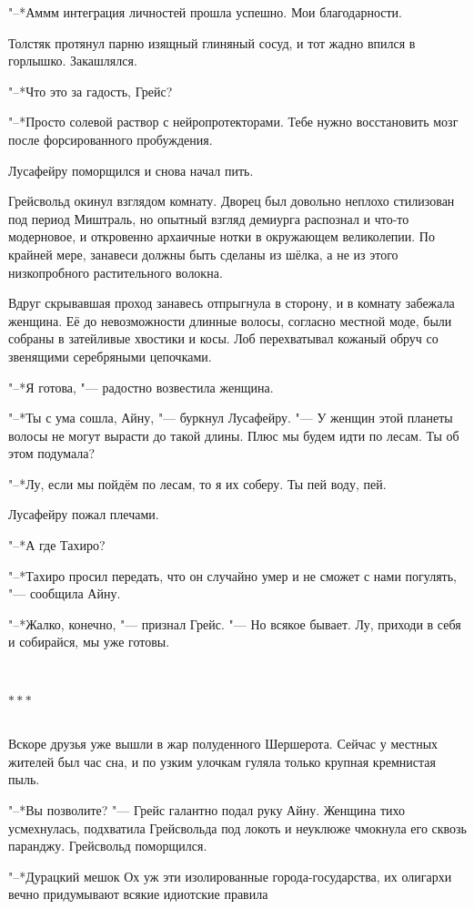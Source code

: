 \documentclass[a4paper,10pt]{book}
\newcommand{\ldotst}{\so{...}\xspace}
\newcommand{\razd}{~\\{\centering\Large\bfseries$\ast \ast \ast$\par}~\\}
\begin{document}
"--*Аммм\ldotst интеграция личностей прошла успешно. Мои благодарности.

Толстяк протянул парню изящный глиняный сосуд, и тот жадно впился в горлышко. 
Закашлялся.

"--*Что это за гадость, Грейс?

"--*Просто солевой раствор с нейропротекторами. Тебе нужно восстановить мозг 
после форсированного пробуждения.

Лусафейру поморщился и снова начал пить.

Грейсвольд окинул взглядом комнату. Дворец был довольно неплохо стилизован под 
период Миштраль, но опытный взгляд демиурга распознал и что-то модерновое, и 
откровенно архаичные нотки в окружающем великолепии. По крайней мере, занавеси 
должны быть сделаны из шёлка, а не из этого низкопробного растительного волокна.

Вдруг скрывавшая проход занавесь отпрыгнула в сторону, и в комнату забежала 
женщина. Её до невозможности длинные волосы, согласно местной моде, были 
собраны в затейливые хвостики и косы. Лоб перехватывал кожаный обруч со 
звенящими серебряными цепочками.

"--*Я готова, "--- радостно возвестила женщина.

"--*Ты с ума сошла, Айну, "--- буркнул Лусафейру. "--- У женщин этой планеты 
волосы не могут вырасти до такой длины. Плюс мы будем идти по лесам. Ты об этом 
подумала?

"--*Лу, если мы пойдём по лесам, то я их соберу. Ты пей воду, пей.

Лусафейру пожал плечами.

"--*А где Тахиро?

"--*Тахиро просил передать, что он случайно умер и не сможет с нами погулять, 
"--- сообщила Айну.

"--*Жалко, конечно, "--- признал Грейс. "--- Но всякое бывает. Лу, приходи в 
себя и собирайся, мы уже готовы.

\razd

Вскоре друзья уже вышли в жар полуденного Шершерота. Сейчас у местных жителей 
был час сна, и по узким улочкам гуляла только крупная кремнистая пыль.

"--*Вы позволите? "--- Грейс галантно подал руку Айну. Женщина тихо 
усмехнулась, подхватила Грейсвольда под локоть и неуклюже чмокнула его сквозь 
паранджу. Грейсвольд поморщился.

"--*Дурацкий мешок\ldotst Ох уж эти изолированные города-государства, их 
олигархи вечно придумывают всякие идиотские правила\ldotst
\end{document}
